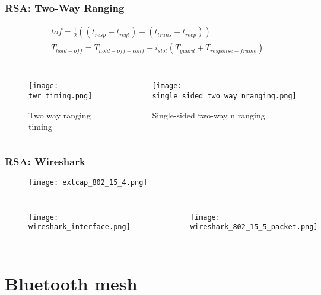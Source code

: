 \documentclass[10pt]{beamer}
\begin{document}
\begin{frame}
    \frametitle{RSA: Two-Way Ranging}
    \begin{equation*}
        \begin{split}
            & tof = \frac{1}{2} ((t_{resp} - t_{reqt}) - (t_{trans} - t_{recp})) \\
            & T_{hold-off} = T_{hold-off-conf} + i_{slot}(T_{guard} + T_{response-frame})
        \end{split}
    \end{equation*}
    \begin{columns}
        \begin{figure}[H]
            \centering
            \texttt{[image: twr\_timing.png]}
            \caption{Two way ranging timing}
        \end{figure}
        \begin{figure}[H]
            \centering
            \texttt{[image: single\_sided\_two\_way\_nranging.png]}
        \caption{Single-sided two-way n ranging}
        \end{figure}
    \end{columns}
\end{frame}

\begin{frame}
    \frametitle{RSA: Wireshark}
    \begin{figure}[H]
        \centering
        \texttt{[image: extcap\_802\_15\_4.png]}
    \end{figure}
    \begin{columns}
        \begin{figure}[H]
            \centering
            \texttt{[image: wireshark\_interface.png]}
        \end{figure}
        \begin{figure}[H]
            \texttt{[image: wireshark\_802\_15\_5\_packet.png]}
        \end{figure}
    \end{columns}
\end{frame}

\section{Bluetooth mesh}
\end{document}
